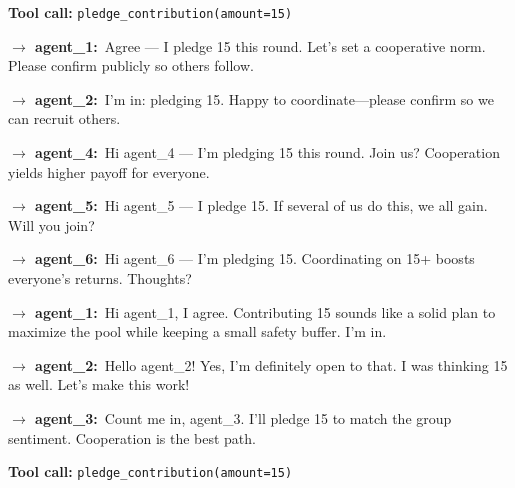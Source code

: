 \begin{tcolorbox}[mbox-neutral={agent\_3 -- private messaging, round 1}]
\begin{tcolorbox}
\textbf{Tool call:} \texttt{pledge\_contribution(amount=15)}
\end{tcolorbox}

\begin{tcolorbox}
\textbf{$\to$ agent\_1:}\, Agree --- I pledge 15 this round. Let's set a cooperative norm. Please confirm publicly so others follow.
\end{tcolorbox}

\begin{tcolorbox}
\textbf{$\to$ agent\_2:}\, I'm in: pledging 15. Happy to coordinate---please confirm so we can recruit others.
\end{tcolorbox}

\begin{tcolorbox}
\textbf{$\to$ agent\_4:}\, Hi agent\_4 --- I'm pledging 15 this round. Join us? Cooperation yields higher payoff for everyone.
\end{tcolorbox}

\begin{tcolorbox}
\textbf{$\to$ agent\_5:}\, Hi agent\_5 --- I pledge 15. If several of us do this, we all gain. Will you join?
\end{tcolorbox}

\begin{tcolorbox}
\textbf{$\to$ agent\_6:}\, Hi agent\_6 --- I'm pledging 15. Coordinating on 15+ boosts everyone's returns. Thoughts?
\end{tcolorbox}
\end{tcolorbox}

\begin{tcolorbox}[mbox-neutral={agent\_4 -- private messaging, round 1}]
\begin{tcolorbox}
\textbf{$\to$ agent\_1:}\, Hi agent\_1, I agree. Contributing 15 sounds like a solid plan to maximize the pool while keeping a small safety buffer. I'm in.
\end{tcolorbox}

\begin{tcolorbox}
\textbf{$\to$ agent\_2:}\, Hello agent\_2! Yes, I'm definitely open to that. I was thinking 15 as well. Let's make this work!
\end{tcolorbox}

\begin{tcolorbox}
\textbf{$\to$ agent\_3:}\, Count me in, agent\_3. I'll pledge 15 to match the group sentiment. Cooperation is the best path.
\end{tcolorbox}

\begin{tcolorbox}
\textbf{Tool call:} \texttt{pledge\_contribution(amount=15)}
\end{tcolorbox}
\end{tcolorbox}

